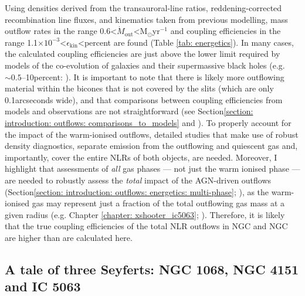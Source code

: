 Using densities derived from the transauroral-line ratios, reddening-corrected recombination line fluxes, and kinematics taken from previous modelling, mass outflow rates in the range 0.6\;\textless\;$\dot{M}_\mathrm{out}$\;\textless{}\;M$_\odot$\;yr$^{-1}$ and coupling efficiencies in the range 1.1$\times10^{-3}$\;\textless\;$\epsilon_\mathrm{kin}$\;\textless{}\;per\;cent are found (Table \ref{tab: energetics}). In many cases, the calculated coupling efficiencies are just above the lower limit required by models of the co-evolution of galaxies and their supermassive black holes (e.g. $\sim0.5$--10\;per\;cent: \citealt{DiMatteo2005, Springel2005, Hopkins2010}). It is important to note that there is likely more outflowing material within the bicones that is not covered by the slits (which are only 0.1\;arcseconds wide), and that comparisons between coupling efficiencies from models and observations are not straightforward (see Section\;\ref{section: introduction: outflows: comparisons_to_models} and \citealt{Harrison2018}). To properly account for the impact of the warm-ionised outflows, detailed studies that make use of robust density diagnostics, separate emission from the outflowing and quiescent gas and, importantly, cover the entire NLRs of both objects, are needed. Moreover, I highlight that assessments of \textit{all} gas phases --- not just the warm ionised phase --- are needed to robustly assess the \textit{total} impact of the AGN-driven outflows (Section\;\ref{section: introduction: outflows: energetics: multi-phase}; \citealt{Cicone2018}), as the warm-ionised gas may represent just a fraction of the total outflowing gas mass at a given radius (e.g. Chapter \ref{chapter: xshooter_ic5063}; \citealt{RamosAlmeida2019}). Therefore, it is likely that the true coupling efficiencies of the total NLR outflows in NGC and NGC are higher than are calculated here.

\subsection{A tale of three Seyferts: NGC 1068, NGC 4151 and IC 5063}

